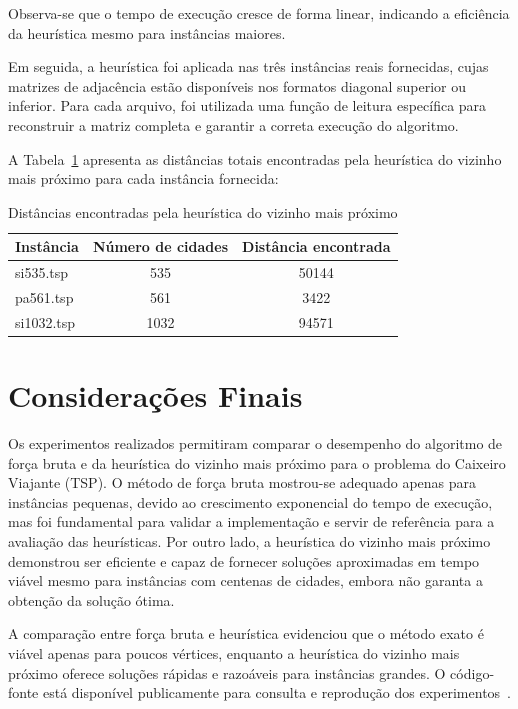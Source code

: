 \documentclass{article}
\begin{document}
\noindent Observa-se que o tempo de execução cresce de forma linear, indicando a eficiência da heurística mesmo para instâncias maiores.

Em seguida, a heurística foi aplicada nas três instâncias reais fornecidas, cujas matrizes de adjacência estão disponíveis nos formatos diagonal superior ou inferior. Para cada arquivo, foi utilizada uma função de leitura específica para reconstruir a matriz completa e garantir a correta execução do algoritmo.

A Tabela~\ref{tab:heuristica} apresenta as distâncias totais encontradas pela heurística do vizinho mais próximo para cada instância fornecida:

\begin{table}[h!]
    \centering
    \begin{tabular}{lcc}
        \toprule
        Instância & Número de cidades & Distância encontrada \\
        \midrule
        si535.tsp  & 535  & 50144 \\
        pa561.tsp  & 561  & 3422 \\
        si1032.tsp & 1032 & 94571 \\
        \bottomrule
    \end{tabular}
    \caption{Distâncias encontradas pela heurística do vizinho mais próximo}
    \label{tab:heuristica}
\end{table}

\section{Considerações Finais}

Os experimentos realizados permitiram comparar o desempenho do algoritmo de força bruta e da heurística do vizinho mais próximo para o problema do Caixeiro Viajante (TSP). O método de força bruta mostrou-se adequado apenas para instâncias pequenas, devido ao crescimento exponencial do tempo de execução, mas foi fundamental para validar a implementação e servir de referência para a avaliação das heurísticas. Por outro lado, a heurística do vizinho mais próximo demonstrou ser eficiente e capaz de fornecer soluções aproximadas em tempo viável mesmo para instâncias com centenas de cidades, embora não garanta a obtenção da solução ótima.

A comparação entre força bruta e heurística evidenciou que o método exato é viável apenas para poucos vértices, enquanto a heurística do vizinho mais próximo oferece soluções rápidas e razoáveis para instâncias grandes. O código-fonte está disponível publicamente para consulta e reprodução dos experimentos~\cite{guimaraes2025github}.

\printbibliography
\end{document}
